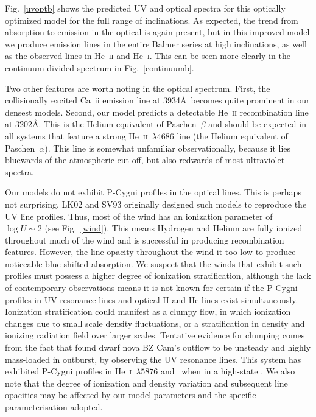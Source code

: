 \documentclass[preprint, a4paper, 11pt]{aastex}
\begin{document}
Fig.~\ref{uvoptb} shows the predicted UV and optical spectra for this
optically optimized model for the full range of inclinations. 
As expected, the trend from absorption to emission 
in the optical is again present, but in this improved model we produce emission
lines in the entire Balmer series at high inclinations, as well as the observed lines 
in He~\textsc{ii} and He~\textsc{i}. This can be seen more clearly in the 
continuum-divided spectrum in Fig.~\ref{continuumb}.

Two other features are worth noting in the optical
spectrum. First, the collisionally excited Ca~{\sc ii} emission line at 3934\AA\ 
becomes quite prominent in our densest models. Second, our model predicts a detectable
He~\textsc{ii} recombination line at 3202\AA. This is the Helium
equivalent of Paschen~$\beta$ and should be expected in all systems that
feature a strong He~\textsc{ii}~$\lambda4686$ line (the Helium
equivalent of Paschen~$\alpha$). 
This line is somewhat unfamiliar observationally, because it 
lies bluewards of the atmospheric cut-off, but
also redwards of most ultraviolet spectra. 

Our models do not exhibit P-Cygni profiles in the optical lines.
This is perhaps not surprising. LK02 and SV93 originally designed such models
to reproduce the UV line profiles. Thus, most of the wind
has an ionization parameter of $\log U \sim 2$ (see Fig.~\ref{wind}).
This means Hydrogen and Helium are fully ionized throughout 
much of the wind and is successful in producing recombination features.
However, the line opacity throughout the wind it too
low to produce noticeable blue shifted absorption. 
We suspect that the winds that exhibit such profiles must 
possess a higher degree of ionization stratification, although the lack 
of contemporary observations means it is not known for certain if the 
P-Cygni profiles in UV resonance lines and optical H and He lines exist simultaneously.
Ionization stratification could manifest as a clumpy flow, in which ionization changes
due to small scale density fluctuations, or a stratification in density
and ionizing radiation field over larger scales.
Tentative evidence for clumping comes from the fact that \cite{prinja2000}
found dwarf nova BZ Cam's outflow to be unsteady and highly mass-loaded in outburst,
by observing the UV resonance lines.
This system has exhibited P-Cygni profiles in He~\textsc{i}~$\lambda5876$
and \ha\ when in a high-state \cite{patterson1996,RN98}. 
We also note that the degree of ionization and density variation and 
subsequent line opacities may be affected by our model parameters
and the specific parameterisation adopted.
\end{document}
